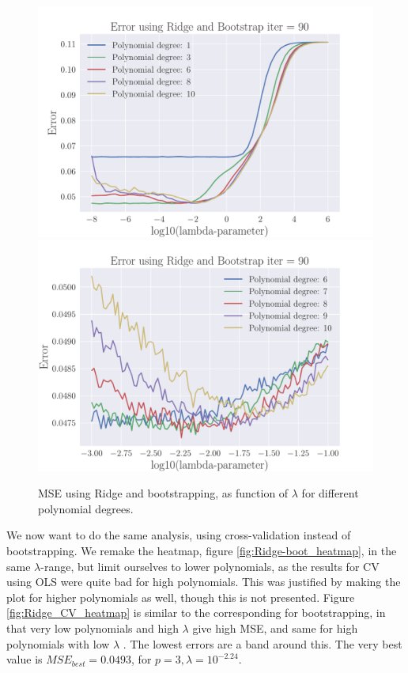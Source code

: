 \documentclass[reprint,english,notitlepage,aps,nobalancelastpage,nofootinbib]{revtex4-1}  %
\begin{document}
\begin{figure}[h]
	\includegraphics[width=\linewidth]{lambdaMSE_Ridge_Bootstrap90_n30_eps02_p10_lm8_6.pdf}
	\endminipage\hfill
	\includegraphics[width=\linewidth]{lambdaMSE_Ridge_Bootstrap90_n30_eps02_p10_lm3_m1.pdf}
	\endminipage
	\caption{MSE using Ridge and bootstrapping, as function of $\lambda$ for different polynomial degrees.}
	\label{fig:Ridge-boot_lambdas}
\end{figure}


We now want to do the same analysis, using cross-validation instead of bootstrapping. We remake the heatmap, figure \ref{fig:Ridge-boot_heatmap}, in the same $\lambda$-range, but limit ourselves to lower polynomials, as the results for CV using OLS were quite bad for high polynomials. This was justified by making the plot for higher polynomials as well, though this is not presented. Figure \ref{fig:Ridge_CV_heatmap} is similar to the corresponding for bootstrapping, in that very low polynomials and high $\lambda$ give high MSE, and same for high polynomials with low $\lambda$ . The lowest errors are a band around this. The very best value is $MSE_{best}=0.0493$, for $p=3, \lambda=10^{-2.24}$.
\end{document}
